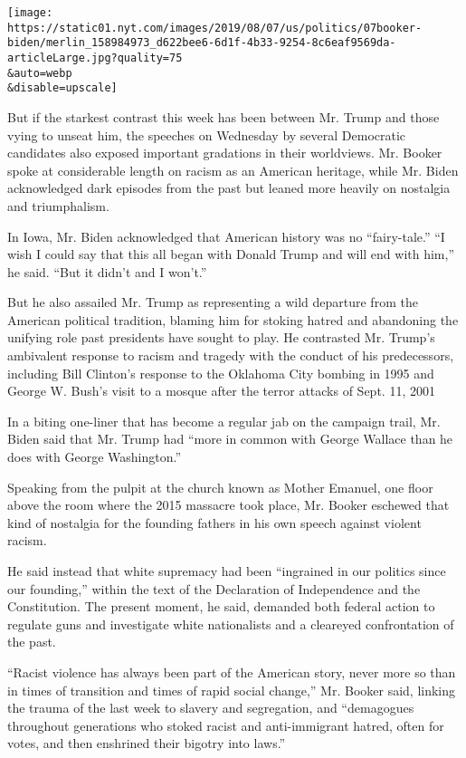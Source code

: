 \texttt{[image: https://static01.nyt.com/images/2019/08/07/us/politics/07booker-biden/merlin\_158984973\_d622bee6-6d1f-4b33-9254-8c6eaf9569da-articleLarge.jpg?quality=75\\\&auto=webp\\\&disable=upscale]}

But if the starkest contrast this week has been between Mr. Trump and
those vying to unseat him, the speeches on Wednesday by several
Democratic candidates also exposed important gradations in their
worldviews. Mr. Booker spoke at considerable length on racism as an
American heritage, while Mr. Biden acknowledged dark episodes from the
past but leaned more heavily on nostalgia and triumphalism.

In Iowa, Mr. Biden acknowledged that American history was no
``fairy-tale.'' ``I wish I could say that this all began with Donald
Trump and will end with him,'' he said. ``But it didn't and I won't.''

But he also assailed Mr. Trump as representing a wild departure from the
American political tradition, blaming him for stoking hatred and
abandoning the unifying role past presidents have sought to play. He
contrasted Mr. Trump's ambivalent response to racism and tragedy with
the conduct of his predecessors, including Bill Clinton's response to
the Oklahoma City bombing in 1995 and George W. Bush's visit to a mosque
after the terror attacks of Sept. 11, 2001

In a biting one-liner that has become a regular jab on the campaign
trail, Mr. Biden said that Mr. Trump had ``more in common with George
Wallace than he does with George Washington.''

Speaking from the pulpit at the church known as Mother Emanuel, one
floor above the room where the 2015 massacre took place, Mr. Booker
eschewed that kind of nostalgia for the founding fathers in his own
speech against violent racism.

He said instead that white supremacy had been ``ingrained in our
politics since our founding,'' within the text of the Declaration of
Independence and the Constitution. The present moment, he said, demanded
both federal action to regulate guns and investigate white nationalists
and a cleareyed confrontation of the past.

``Racist violence has always been part of the American story, never more
so than in times of transition and times of rapid social change,'' Mr.
Booker said, linking the trauma of the last week to slavery and
segregation, and ``demagogues throughout generations who stoked racist
and anti-immigrant hatred, often for votes, and then enshrined their
bigotry into laws.''

